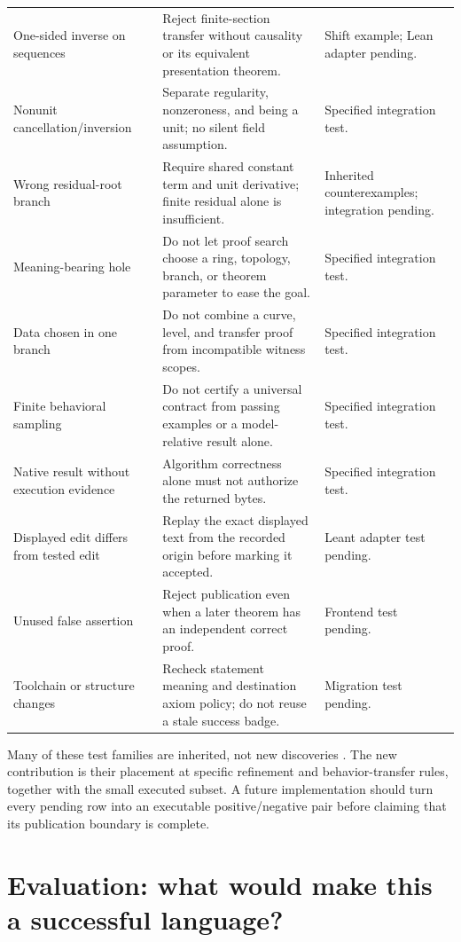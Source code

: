 \documentclass[11pt,letterpaper]{article}
\theoremstyle{definition}
\theoremstyle{remark}
\begin{document}
\begin{longtable}{@{}P{1.4in}P{3.37in}P{1.08in}@{}}
One-sided inverse on sequences & Reject finite-section transfer without causality or its equivalent presentation theorem. & Shift example; Lean adapter pending.\\
Nonunit cancellation/inversion & Separate regularity, nonzeroness, and being a unit; no silent field assumption. & Specified integration test.\\
Wrong residual-root branch & Require shared constant term and unit derivative; finite residual alone is insufficient. & Inherited counterexamples; integration pending.\\
Meaning-bearing hole & Do not let proof search choose a ring, topology, branch, or theorem parameter to ease the goal. & Specified integration test.\\
Data chosen in one branch & Do not combine a curve, level, and transfer proof from incompatible witness scopes. & Specified integration test.\\
Finite behavioral sampling & Do not certify a universal contract from passing examples or a model-relative result alone. & Specified integration test.\\
Native result without execution evidence & Algorithm correctness alone must not authorize the returned bytes. & Specified integration test.\\
Displayed edit differs from tested edit & Replay the exact displayed text from the recorded origin before marking it accepted. & Leant adapter test pending.\\
Unused false assertion & Reject publication even when a later theorem has an independent correct proof. & Frontend test pending.\\
Toolchain or structure changes & Recheck statement meaning and destination axiom policy; do not reuse a stale success badge. & Migration test pending.\\
\bottomrule
\end{longtable}
\endgroup

Many of these test families are inherited, not new discoveries
\cite{syn-a,syn-b}. The new contribution is their placement at specific
refinement and behavior-transfer rules, together with the small executed subset.
A future implementation should turn every pending row into an executable
positive/negative pair before claiming that its publication boundary is complete.

\section{Evaluation: what would make this a successful language?}\label{sec:evaluation}
\end{document}
